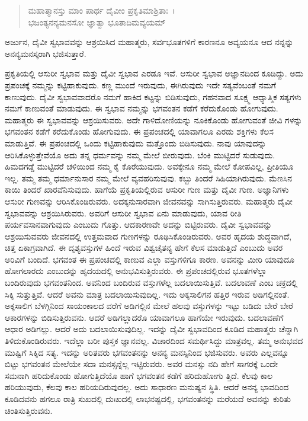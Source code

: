 \begin{verse}
ಮಹಾತ್ಮಾನಸ್ತು ಮಾಂ ಪಾರ್ಥ ದೈವೀಂ ಪ್ರಕೃತಿಮಾಶ್ರಿತಾಃ~।\\ಭಜಂತ್ಯನನ್ಯಮನಸೋ ಜ್ಞಾತ್ವಾ ಭೂತಾದಿಮವ್ಯಯಮ್ 
\end{verse}

{\small ಅರ್ಜುನ, ದೈವೀ ಸ್ವಭಾವವನ್ನು ಆಶ್ರಯಿಸಿದ ಮಹಾತ್ಮರು, ಸರ್ವಭೂತಗಳಿಗೆ ಕಾರಣನೂ ಅವ್ಯಯನೂ ಆದ ನನ್ನನ್ನು ಅನನ್ಯಮನಸ್ಕರಾಗಿ ಭಜಿಸುತ್ತಾರೆ.}

ಪ್ರಕೃತಿಯಲ್ಲಿ ಆಸುರೀ ಸ್ವಭಾವ ಮತ್ತು ದೈವೀ ಸ್ವಭಾವ ಎರಡೂ ಇವೆ. ಆಸುರೀ ಸ್ವಭಾವ ಅಜ್ಞಾನದಿಂದ ಕೂಡಿದ್ದು. ಅದು ಪ್ರಪಂಚಕ್ಕೆ ನಮ್ಮನ್ನು ಕಟ್ಟಿಹಾಕುವುದು. ಕಣ್ಣ ಮುಂದೆ ಇರುವುದು, ಈಗಿರುವುದು ಇದೇ ಸತ್ಯವೆಂಬಂತೆ ನಮಗೆ ಕಾಣುವುದು. ದೈವೀ ಸ್ವಭಾವವಾದರೊ ನಮಗೆ ಹಾಕಿದ ಕಟ್ಟನ್ನು ಬಿಡಿಸುವುದು, ಗಹನವಾದ ಸೂಕ್ಷ್ಮ ಆಧ್ಯಾತ್ಮಿಕ ಸತ್ಯಗಳು ನಮಗೆ ಕಾಣುವಂತೆ ಮಾಡುವುದು. ಈ ಸ್ವಭಾವ ನಮ್ಮನ್ನು ಭಗವಂತನ ಕಡೆಗೆ ಕರೆದುಕೊಂಡು ಹೋಗುವುದು. ಮಹಾತ್ಮರು ಈ ಸ್ವಭಾವವನ್ನು ಆಶ್ರಯಿಸುವರು. ಅದೇ ಗಾಳಿದೋಣಿಯನ್ನು ನೂಕಿಕೊಂಡು ಹೋಗುವಂತೆ ಜೀವಿ ಗಳನ್ನು ಭಗವಂತನ ಕಡೆಗೆ ಕರೆದುಕೊಂಡು ಹೋಗುವುದು. ಈ ಪ್ರಪಂಚದಲ್ಲಿ ಯಾವಾಗಲೂ ಎರಡು ಶಕ್ತಿಗಳು ಕೆಲಸ ಮಾಡುತ್ತಿವೆ. ಈ ಪ್ರಪಂಚದಲ್ಲಿ ಒಂದು ಕಟ್ಟಿಹಾಕುವುದು ಮತ್ತೊಂದು ಬಿಡಿಸುವುದು. ನಾವು ಯಾವುದನ್ನು ಆರಿಸಿಕೊಳ್ಳುತ್ತೇವೆಯೊ ಅದು ತನ್ನ ಧರ್ಮವನ್ನು ನಮ್ಮ ಮೇಲೆ ಬೀರುವುದು. ಬೆಂಕಿ ಮುಟ್ಟಿದರೆ ಸುಡುವುದು. ಹಿಮದಗಡ್ಡೆ ಮುಟ್ಟಿದರೆ ಚಳಿಯಿಂದ ನಮ್ಮ ಕೈ ಕೊರೆಯುವುದು. ಅವಕ್ಕೇನೂ ನಮ್ಮ ಮೇಲೆ ಕೋಪವಿಲ್ಲ, ಪ್ರೀತಿಯೂ ಇಲ್ಲ. ತಮ್ಮ ತಮ್ಮ ಧರ್ಮಾನುಸಾರ ನಮ್ಮ ಮೇಲೆ ವ್ಯವಹರಿಸುವುವು. ಕಬ್ಬು ತಿಂದರೆ ಸಿಹಿಯಾಗಿರುವುದು. ಮೆಣಸಿನ ಕಾಯಿ ತಿಂದರೆ ಖಾರವೆನಿಸುವುದು. ಹಾಗೆಯೆ ಪ್ರಕೃತಿಯಲ್ಲಿರುವ ಆಸುರೀ ಗುಣ ಮತ್ತು ದೈವೀ ಗುಣ. ಅಜ್ಞಾನಿಗಳು ಆಸುರೀ ಗುಣವನ್ನು ಆರಿಸಿಕೊಂಡಿರುವರು. ಅದಕ್ಕನುಸಾರವಾಗಿ ಜೀವನವನ್ನು ಸಾಗಿಸುತ್ತಿರುವರು. ಮಹಾತ್ಮರು ದೈವೀ ಸ್ವಭಾವವನ್ನು ಆಶ್ರಯಿಸಿರುವರು. ಅವರಿಗೆ ಆಸುರೀ ಸ್ವಭಾವ ಏನು ಮಾಡುವುದು, ಯಾವ ರೀತಿ ಪರ್ಯವಸಾನವಾಗುವುದು ಎಂಬುದು ಗೊತ್ತು. ಆದಕಾರಣವೇ ಅದನ್ನು ಬಿಟ್ಟಿರುವರು. ದೈವೀ ಸ್ವಭಾವವನ್ನು ಆಶ್ರಯಿಸುವವರು ಜೀವನದಲ್ಲಿ ಉತ್ತಮವಾದ ಗುಣಗಳನ್ನು ರೂಢಿಸಿಕೊಂಡಿರುವರು. ಅವರ ಹೃದಯ ಶುದ್ಧವಾಗಿದೆ, ಚಿತ್ತ ಏಕಾಗ್ರವಾಗಿದೆ. ಈ ದೃಶ್ಯವಸ್ತುಗಳ ಹಿಂದೆ ಇರುವ ವಿಶ್ವಚೈತನ್ಯ ಹೇಗೆ ಕೆಲಸ ಮಾಡುತ್ತಿದೆ ಎಂಬುದು ಅವರ ಅರಿವಿಗೆ ಬಂದಿದೆ. ಭಗವಂತ ಈ ಪ್ರಪಂಚದಲ್ಲಿ ಕಾಣುವ ಎಲ್ಲಾ ವಸ್ತುಗಳಿಗೂ ಕಾರಣ. ಅವನನ್ನು ಮೀರಿ ಯಾವುದೂ ಹೋಗಲಾರದು ಎಂಬುದನ್ನು ಹೃದಯದಲ್ಲಿ ಅನುಭವಿಸುತ್ತಿರುವರು. ಈ ಪ್ರಪಂಚದಲ್ಲಿರುವ ಭೂತಗಳೆಲ್ಲಾ ಬಂದಿರುವುದು ಭಗವಂತನಿಂದ. ಅವನಿಂದ ಬಂದಿರುವ ವಸ್ತುಗಳೆಲ್ಲ ಬದಲಾಯಿಸುತ್ತಿವೆ. ಬದಲಾವಣೆ ಎಂಬ ಚಕ್ರದಲ್ಲಿ ಸಿಕ್ಕಿ ಸುತ್ತುತ್ತಿವೆ. ಆದರೆ ಅವನು ಮಾತ್ರ ಬದಲಾಯಿಸುವುದಿಲ್ಲ. ಇದು ಅಕ್ಕಸಾಲಿಗನ ಹತ್ತಿರ ಇರುವ ಅಡಿಗಲ್ಲಿನಂತೆ. ಅಕ್ಕಸಾಲಿಗ ಬೆಳಗ್ಗಿನಿಂದ ಸಾಯಂಕಾಲದ ವರೆಗೆ ಅಡಿಗಲ್ಲಿನ ಮೇಲೆ ಹಲವು ವಸ್ತುಗಳನ್ನು ಇಟ್ಟು ಬಡಿದು ಬೇರೆ ಬೇರೆ ಆಕಾರಗಳನ್ನು ಬಿಡಿಸುತ್ತಿರುವನು. ಆದರೆ ಅಡಿಗಲ್ಲಾದರೊ ಯಾವಾಗಲೂ ಹಾಗೆಯೇ ಇರುವುದು. ಬದಲಾವಣೆಗೆ ಆಧಾರ ಅಡಿಗಲ್ಲು. ಆದರೆ ಅದು ಬದಲಾಯಿಸುವುದಿಲ್ಲ. ಇದನ್ನು ದೈವೀ ಸ್ವಭಾವದಿಂದ ಕೂಡಿದ ಮಹಾತ್ಮರು ಚೆನ್ನಾಗಿ ತಿಳಿದುಕೊಂಡಿರುವರು. ಇದೆಲ್ಲಾ ಬರೀ ಪುಸ್ತಕ ಜ್ಞಾನವಲ್ಲ. ವಿಚಾರದಿಂದ ಸಮರ್ಥಿಸಿದ್ದು ಮಾತ್ರವಲ್ಲ. ತಮ್ಮ ಅನುಭವದ ಮುಷ್ಟಿಗೆ ಸಿಕ್ಕಿದ ಸತ್ಯ. ಇದನ್ನು ಅರಿತವರು ಭಗವಂತನನ್ನು ಅನನ್ಯ ಮನಸ್ಸಿನಿಂದ ಭಜಿಸುವರು. ಅವರು ಎಲ್ಲವನ್ನೂ ಬಿಟ್ಟು ಭಗವಂತನ ಮೇಲೆಯೇ ಸದಾ ಮನಸ್ಸನ್ನೆಲ್ಲ ಇಟ್ಟಿರುವರು. ಅವರ ಮನಸ್ಸು ನದಿ ಹೇಗೆ ಸಾಗರಕ್ಕೆ ಒಂದೇ ಸಮನಾಗಿ ಹರಿದುಕೊಂಡು ಹೋಗುತ್ತಿದೆಯೊ ಹಾಗೆ ಭಗವಂತನ ಕಡೆಗೆ ಹರಿದುಹೋಗು ತ್ತಿದೆ. ಕೆಲವು ಕಾಲ ಹರಿಯುವುದು, ಕೆಲವು ಕಾಲ ಹರಿಯದಿರುವುದಲ್ಲ. ಅದು ಸಾಧಾರಣ ಮನುಷ್ಯನ ಸ್ಥಿತಿ. ಆದರೆ ಅನನ್ಯ ಭಾವದಿಂದ ಕೂಡಿದವನು ಹಗಲೂ ರಾತ್ರಿ ಸುಖದಲ್ಲಿ ದುಃಖದಲ್ಲಿ ಲಾಭನಷ್ಟದಲ್ಲಿ, ಭಗವಂತನನ್ನು ಮರೆಯದೆ ಅವನನ್ನು ಕುರಿತು ಚಿಂತಿಸುತ್ತಿರುವನು.

